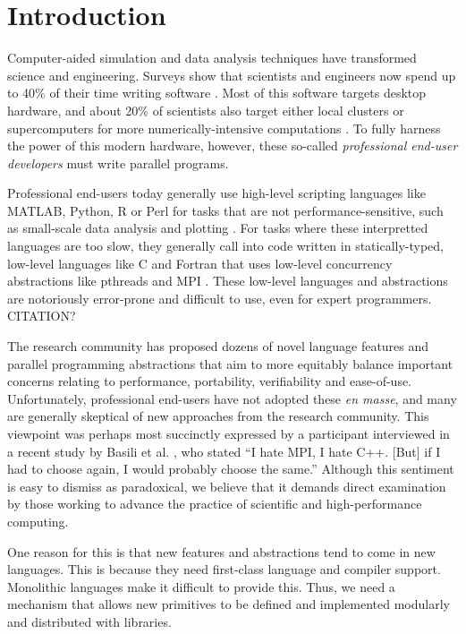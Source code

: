 \documentclass[10pt, conference, compsocconf]{IEEEtran}
\begin{document}
\section{Introduction}

Computer-aided simulation and data analysis techniques have transformed science and engineering. Surveys show that scientists and engineers now spend up to 40\% of their time writing software \cite{howison2011scientific, hannay2009scientists}. Most of this software targets desktop hardware, and about 20\% of scientists also target either local clusters or super\-computers for more numerically-intensive computations \cite{hannay2009scientists}. To fully harness the power of this modern hardware, however, these so-called {\em professional end-user developers} \cite{segal2007some} must write parallel programs.

Professional end-users today generally use high-level scripting languages like MATLAB, Python, R or Perl for tasks that are not performance-sensitive, such as small-scale data analysis and plotting \cite{nguyen2010survey}. For tasks where these interpretted languages are too slow, they generally call into code written in statically-typed, low-level languages like C and Fortran that uses low-level concurrency abstractions like pthreads and MPI \cite{4222616,basili2008understanding}. These low-level languages and abstractions are notoriously error-prone and difficult to use, even for expert programmers. {\color{red} CITATION?}

The research community has proposed dozens of novel language features and parallel programming abstractions that aim to  more equitably balance important concerns relating to performance, portability, verifiability and ease-of-use. Unfortunately, professional end-users have not adopted these {\em en masse}, and many are generally skeptical of new approaches from the research community. This viewpoint was perhaps most succinctly expressed by a participant interviewed in a recent study by Basili et al. \cite{basili2008understanding}, who stated ``I hate MPI, I hate C++. [But] if I had to choose again, I would probably choose the same.'' Although this sentiment is easy to dismiss as paradoxical, we believe that it demands direct examination by those working to advance the practice of scientific and high-performance computing. 

One reason for this is that new features and abstractions tend to come in new languages. This is because they need first-class language and compiler support. Monolithic languages make it difficult to provide this. Thus, we need a mechanism that allows new primitives to be defined and implemented modularly and distributed with libraries.
\end{document}
